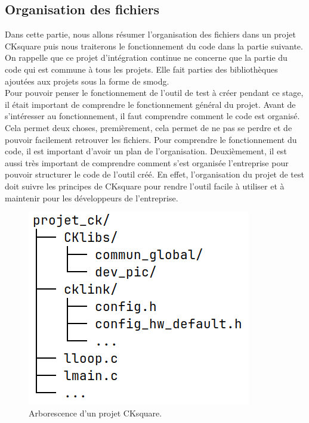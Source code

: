 \documentclass[a4paper]{article}
\begin{document}
\subsection{Organisation des fichiers}
\label{orgaprojck}

Dans cette partie, nous allons résumer l'organisation des fichiers dans un
projet CKsquare puis nous traiterons le fonctionnement du code dans la partie
suivante. On rappelle que ce projet d'intégration continue ne concerne que la
partie du code qui est commune à tous les projets. Elle fait parties des
bibliothèques ajoutées aux projets sous la forme de \gls{smodg}. \\

Pour pouvoir penser le fonctionnement de l'outil de test à créer pendant ce
stage, il était important de comprendre le fonctionnement général du projet.
Avant de s'intéresser au fonctionnement, il faut comprendre comment le code est
organisé. Cela permet deux choses, premièrement, cela permet de ne pas se perdre
et de pouvoir facilement retrouver les fichiers. Pour comprendre le
fonctionnement du code, il est important d'avoir un plan de l'organisation.
Deuxièmement, il est aussi très important de comprendre comment s'est organisée
l'entreprise pour pouvoir structurer le code de l'outil créé. En
effet, l'organisation du projet de test doit suivre les principes de CKsquare
pour rendre l'outil facile à utiliser et à maintenir pour les développeurs de
l'entreprise.

\begin{figure}[h!]
  \begin{center}
    \includegraphics[scale=0.5]{./img/arborescence-proj.png}
    \caption{Arborescence d'un projet CKsquare.}
    \label{fig:arbrprojck}
  \end{center}
\end{figure}
\end{document}

